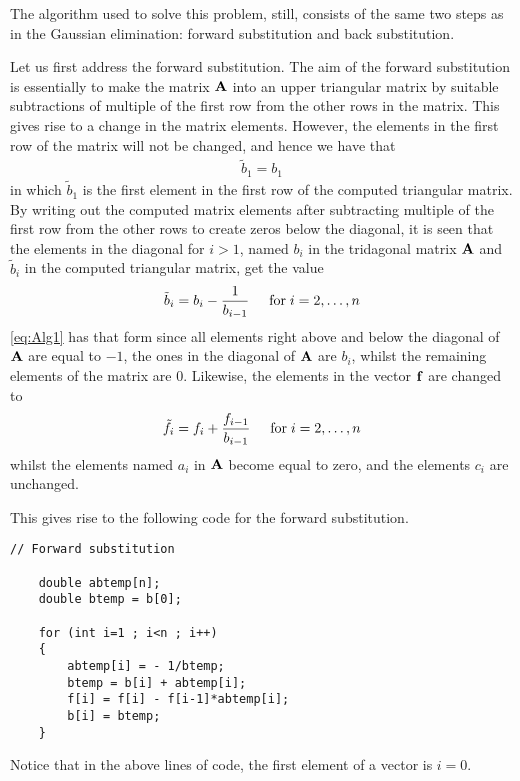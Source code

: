 The algorithm used to solve this problem, still, consists of the same two steps as in the Gaussian elimination: forward substitution and back substitution. 

Let us first address the forward substitution. 
The aim of the forward substitution is essentially to make the matrix $\mbox{\textbf{A}}$ into an upper triangular matrix by suitable subtractions of multiple of the first row from the other rows in the matrix. 
This gives rise to a change in the matrix elements. 
However, the elements in the first row of the matrix will not be changed, and hence we have that
\begin{align}
	\tilde{b}_1 = b_1
\end{align} 
in which $\tilde{b}_1$ is the first element in the first row of the computed triangular matrix.
By writing out the computed matrix elements after subtracting multiple of the first row from the other rows to create zeros below the diagonal, it is seen that the elements in the diagonal for $i>1$, named $b_i$ in the tridagonal matrix $\mbox{\textbf{A}}$ and $\tilde{b}_i$ in the computed triangular matrix, get the value
\begin{align}
	\tilde{b}_i = b_i - \frac{1}{b_{i-1}}
	\hspace{0.5cm} \mathrm{for} \hspace{0.1cm} i=2,\dots, n
	\label{eq:Alg1}
\end{align}
\eqref{eq:Alg1} has that form since all elements right above and below the diagonal of $\mbox{\textbf{A}}$ are equal to $-1$, the ones in the diagonal of $\mbox{\textbf{A}}$ are $b_i$, whilst the remaining elements of the matrix are $0$.
Likewise, the elements in the vector $\mbox{\textbf{f}}$ are changed to
\begin{align}
	\tilde{f}_i = f_i + \frac{f_{i-1}}{b_{i-1}}
	\hspace{0.5cm} \mathrm{for} \hspace{0.1cm} i=2,\dots, n
	\label{eq:Alg2}
\end{align}
whilst the elements named $a_i$ in $\mbox{\textbf{A}}$ become equal to zero, and the elements $c_i$ are unchanged. 

This gives rise to the following code for the forward substitution.

\begin{lstlisting}
// Forward substitution

    double abtemp[n];
    double btemp = b[0];

    for (int i=1 ; i<n ; i++)
    {
        abtemp[i] = - 1/btemp;
        btemp = b[i] + abtemp[i];
        f[i] = f[i] - f[i-1]*abtemp[i];
        b[i] = btemp;
    }
\end{lstlisting}
Notice that in the above lines of code, the first element of a vector is $i=0$.

